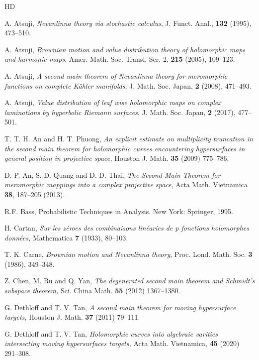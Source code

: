 \documentclass[12pt]{amsart}
\begin{document}
\begin{thebibliography}{HD}

 A. Atsuji, \textit{Nevanlinna theory via stochastic calculus}, J. Funct. Anal., \textbf{132} (1995), 473--510.

 A. Atsuji, \textit{Brownian motion and value distribution theory of holomorphic maps and harmonic maps}, Amer. Math. Soc.
Transl. Ser. 2,  \textbf{215} (2005), 109--123.

 A. Atsuji, \textit{A second main theorem of Nevanlinna theory for meromorphic functions on complete K\"{a}hler manifolds}, J.
Math. Soc. Japan, \textbf{2} (2008), 471--493.

 A. Atsuji, \textit{Value distribution of leaf wise holomorphic maps on complex laminations by hyperbolic Riemann surfaces}, J. Math. Soc. Japan, \textbf{2} (2017), 477--501.

 T. T. H. An and H. T. Phuong, \textit{An explicit estimate on multiplicity truncation in the second main theorem for holomorphic curves encountering hypersurfaces in general position in projective space,} Houston J. Math. \textbf{35} (2009) 775--786.

 D. P. An, S. D. Quang and D. D. Thai, \textit{The Second Main Theorem for meromorphic mappings into a complex projective space}, Acta Math. Vietnamica \textbf{38}, 187--205 (2013).

 R.F. Bass, Probabilistic Techniques in Analysis. New York: Springer, 1995.

 H. Cartan, \textit{Sur les z\'{e}roes des combinaisons lin\'{e}aries de p fonctions holomorphes donn\'{e}es,} Mathematica \textbf{7} (1933), 80--103.

 T. K. Carne, \textit{Brownian motion and Nevanlinna theory}, Proc. Lond. Math. Soc. \textbf{3} (1986), 349--348.

 Z. Chen, M. Ru and Q. Yan, \textit{The degenerated second main theorem and Schmidt's subspace theorem,} Sci. China Math. \textbf{55} (2012) 1367--1380.

 G. Dethloff and T. V. Tan, {\it A second main theorem for moving hypersurface targets,} Houston J. Math. {\bf 37} (2011) 79--111.

 G. Dethloff and T. V. Tan, {\it Holomorphic curves into algebraic varities intersecting moving hypersurfaces targets,} Acta Math. Vietnamica, {\bf 45} (2020) 291--308.


\end{thebibliography}
\end{document}
